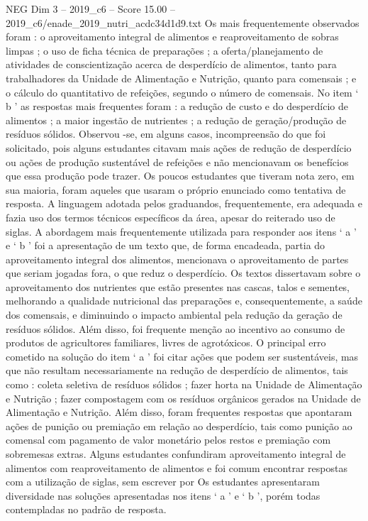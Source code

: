 \begin{textsample}{NEG Dim 3 – 2019\_c6 – Score 15.00 – 2019\_c6/enade\_2019\_nutri\_acdc34d1d9.txt}
Os mais frequentemente observados foram : o aproveitamento integral de alimentos e reaproveitamento de sobras limpas ; o uso de ficha técnica de preparações ; a oferta/planejamento de atividades de conscientização acerca de desperdício de alimentos, tanto para trabalhadores da Unidade de Alimentação e Nutrição, quanto para comensais ; e o cálculo do quantitativo de refeições, segundo o número de comensais.
No item ‘ b ’ as respostas mais frequentes foram : a redução de custo e do desperdício de alimentos ; a maior ingestão de nutrientes ; a redução de geração/produção de resíduos sólidos.
Observou -se, em alguns casos, incompreensão do que foi solicitado, pois alguns estudantes citavam mais ações de redução de desperdício ou ações de produção sustentável de refeições e não mencionavam os benefícios que essa produção pode trazer.
Os poucos estudantes que tiveram nota zero, em sua maioria, foram aqueles que usaram o próprio enunciado como tentativa de resposta.
A linguagem adotada pelos graduandos, frequentemente, era adequada e fazia uso dos termos técnicos específicos da área, apesar do reiterado uso de siglas.
A abordagem mais frequentemente utilizada para responder aos itens ‘ a ’ e ‘ b ’ foi a apresentação de um texto que, de forma encadeada, partia do aproveitamento integral dos alimentos, mencionava o aproveitamento de partes que seriam jogadas fora, o que reduz o desperdício.
Os textos dissertavam sobre o aproveitamento dos nutrientes que estão presentes nas cascas, talos e sementes, melhorando a qualidade nutricional das preparações e, consequentemente, a saúde dos comensais, e diminuindo o impacto ambiental pela redução da geração de resíduos sólidos.
Além disso, foi frequente menção ao incentivo ao consumo de produtos de agricultores familiares, livres de agrotóxicos.
O principal erro cometido na solução do item ‘ a ’ foi citar ações que podem ser sustentáveis, mas que não resultam necessariamente na redução de desperdício de alimentos, tais como : coleta seletiva de resíduos sólidos ; fazer horta na Unidade de Alimentação e Nutrição ; fazer compostagem com os resíduos orgânicos gerados na Unidade de Alimentação e Nutrição.
Além disso, foram frequentes respostas que apontaram ações de punição ou premiação em relação ao desperdício, tais como punição ao comensal com pagamento de valor monetário pelos restos e premiação com sobremesas extras.
Alguns estudantes confundiram aproveitamento integral de alimentos com reaproveitamento de alimentos e foi comum encontrar respostas com a utilização de siglas, sem escrever por Os estudantes apresentaram diversidade nas soluções apresentadas nos itens ‘ a ’ e ‘ b ’, porém todas contempladas no padrão de resposta.

\end{textsample}
